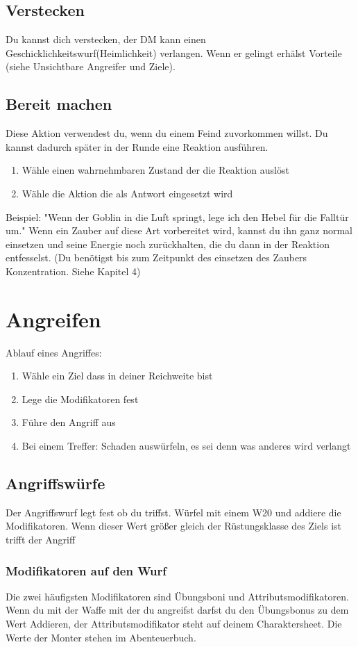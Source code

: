 \subsection{Verstecken}
Du kannst dich verstecken, der DM kann einen Geschicklichkeitswurf(Heimlichkeit) verlangen. Wenn er gelingt erhälst Vorteile (siehe Unsichtbare Angreifer und Ziele).

\subsection{Bereit machen}
Diese Aktion verwendest du, wenn du einem Feind zuvorkommen willst. Du kannst dadurch später in der Runde eine Reaktion ausführen.
\begin{enumerate}
  \item Wähle einen wahrnehmbaren Zustand der die Reaktion auslöst
  \item Wähle die Aktion die als Antwort eingesetzt wird
\end{enumerate}
Beispiel: "Wenn der Goblin in die Luft springt, lege ich den Hebel für die Falltür um."
Wenn ein Zauber auf diese Art vorbereitet wird, kannst du ihn ganz normal einsetzen und seine Energie noch zurückhalten, die du dann in der Reaktion entfesselst. (Du benötigst bis zum Zeitpunkt des einsetzen des Zaubers Konzentration. Siehe Kapitel 4)


\section{Angreifen}
Ablauf eines Angriffes:
\begin{enumerate}
  \item Wähle ein Ziel dass in deiner Reichweite bist
  \item Lege die Modifikatoren fest
  \item Führe den Angriff aus
  \item Bei einem Treffer: Schaden auswürfeln, es sei denn was anderes wird verlangt
\end{enumerate}

\subsection{Angriffswürfe}
Der Angriffswurf legt fest ob du triffst. Würfel mit einem W20 und addiere die Modifikatoren. Wenn dieser Wert größer gleich der Rüstungsklasse des Ziels ist trifft der Angriff

\subsubsection{Modifikatoren auf den Wurf}
Die zwei häufigsten Modifikatoren sind Übungsboni und Attributsmodifikatoren. Wenn du mit der Waffe mit der du angreifst darfst du den Übungsbonus zu dem Wert Addieren, der Attributsmodifikator steht auf deinem Charaktersheet. Die Werte der Monter stehen im Abenteuerbuch.

